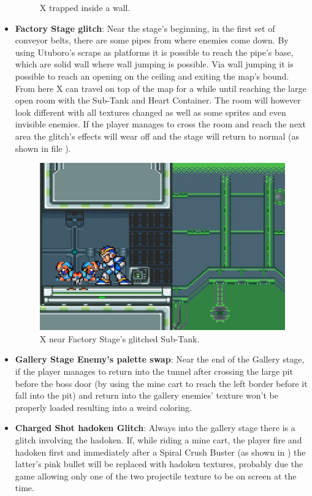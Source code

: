 \begin{itemize}
\begin{figure}[htp]
		\caption{X trapped inside a wall.}
	\end{figure}
	\item \textbf{Factory Stage glitch}: Near the stage's beginning,  in the first set of conveyor belts, there are some pipes from where enemies come down. By using Utuboro's scraps as platforms it is possible to reach the pipe's base, which are solid wall where wall jumping is possible. Via wall jumping it is possible to reach an opening on the ceiling and exiting the map's bound. From here X can travel on top of the map for a while until reaching the large open room with the Sub-Tank and Heart Container. The room will however look different with all textures changed as well as some sprites and even invisible enemies. If the player manages to cross the room and reach the next area the glitch's effects will wear off and the stage will return to normal (as shown in file ).
	\begin{figure}[htp]
		\centering
		\includegraphics[width=0.5\linewidth]{figures/X1/Miscs/Factory_glitch_heart.jpg}
		\caption{X near Factory Stage's glitched Sub-Tank.}
	\end{figure}
	\item \textbf{Gallery Stage Enemy's palette swap}: Near the end of the Gallery stage, if the player manages to return into the tunnel after crossing the large pit before the boss door (by using the mine cart to reach the left border before it fall into the pit) and return into the gallery enemies' texture won't be properly loaded resulting into a weird coloring.
	\item \textbf{Charged Shot hadoken Glitch}: Always into the gallery stage there is a glitch involving the hadoken. If, while riding a mine cart, the player fire and hadoken first and immediately after a Spiral Crush Buster (as shown in ) the latter's pink bullet will be replaced with hadoken textures, probably due the game allowing only one of the two projectile texture to be on screen at the time.
	\begin{figure}[htp]

\end{figure}
\end{itemize}
